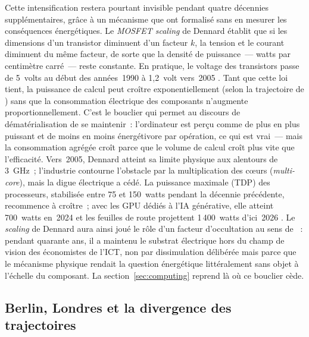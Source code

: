 %
Cette intensification restera pourtant invisible pendant quatre décennies supplémentaires, grâce à un mécanisme que \textcite{dennard_design_1974} ont formalisé sans en mesurer les conséquences énergétiques. Le \emph{MOSFET scaling} de Dennard établit que si les dimensions d'un transistor diminuent d'un facteur $k$, la tension et le courant diminuent du même facteur, de sorte que la densité de puissance~--- watts par centimètre carré~--- reste constante. En pratique, le voltage des transistors passe de 5~volts au début des années~1990 à 1,2~volt vers~2005 \parencite{roussilhe_phase_2025}. Tant que cette loi tient, la puissance de calcul peut croître exponentiellement (selon la trajectoire de \textcite{moore_cramming_1965}) sans que la consommation électrique des composants n'augmente proportionnellement. C'est le bouclier qui permet au discours de dématérialisation de se maintenir~: l'ordinateur est perçu comme de plus en plus puissant et de moins en moins énergétivore par opération, ce qui est vrai~--- mais la consommation agrégée croît parce que le volume de calcul croît plus vite que l'efficacité. Vers~2005, Dennard atteint sa limite physique aux alentours de 3~GHz~; l'industrie contourne l'obstacle par la multiplication des c\oe{}urs (\emph{multi-core}), mais la digue électrique a cédé. La puissance maximale (TDP) des processeurs, stabilisée entre 75 et 150~watts pendant la décennie précédente, recommence à croître~; avec les GPU dédiés à l'IA générative, elle atteint 700~watts en~2024 et les feuilles de route projettent 1\,400~watts d'ici~2026 \parencite{roussilhe_phase_2025, sun_chip_2024}. Le \emph{scaling} de Dennard aura ainsi joué le rôle d'un facteur d'occultation au sens de \textcite{ensmenger_environmental_2018}~: pendant quarante ans, il a maintenu le substrat électrique hors du champ de vision des économistes de l'ICT, non par dissimulation délibérée mais parce que le mécanisme physique rendait la question énergétique littéralement sans objet à l'échelle du composant. La section~\ref{sec:computing} reprend là où ce bouclier cède.

\subsection{Berlin, Londres et la divergence des trajectoires}\label{subsec:trajectoires_europe}

